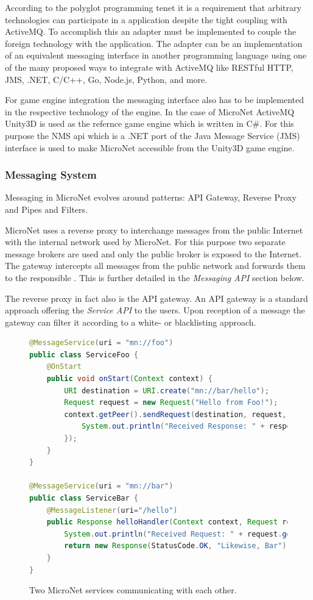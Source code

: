 According to the polyglot programming tenet it is a requirement that arbitrary
technologies can participate in a \ms{} application despite the tight coupling
with ActiveMQ. To accomplish this an adapter must be implemented to couple the
foreign technology with the application. The adapter can be an
implementation of an equivalent messaging interface in another programming
language using one of the many proposed ways to integrate with ActiveMQ like
RESTful HTTP, JMS, .NET, C/C++, Go, Node.js, Python, and more.

For game engine integration the messaging interface also has to be implemented
in the respective technology of the engine. In the case of MicroNet ActiveMQ
Unity3D is used as the refernce game engine which is written in C\#. For this
purpose the NMS \gls{api} which is a .NET port of the Java Message Service (JMS)
interface is used to make MicroNet accessible from the Unity3D game engine.

\subsubsection{Messaging System}

Messaging in MicroNet evolves around patterns: API Gateway, Reverse Proxy and
Pipes and Filters.

MicroNet uses a reverse proxy to interchange messages from the public Internet
with the internal network used by MicroNet. For this purpose two separate
message brokers are used and only the public broker is exposed to the Internet.
The gateway intercepts all messages from the public network and forwards them to
the responsible \ms{}. This is further detailed in the \textit{Messaging API}
section below.

The reverse proxy in fact also is the API gateway. An API gateway is a standard
approach offering the \textit{Service API} to the users. Upon reception of a
message the gateway can filter it according to a white- or blacklisting approach.

\begin{figure}
\begin{lstlisting}[language=Java,firstnumber=1] 
@MessageService(uri = "mn://foo")
public class ServiceFoo {
	@OnStart
	public void onStart(Context context) {
		URI destination = URI.create("mn://bar/hello");
		Request request = new Request("Hello from Foo!");
		context.getPeer().sendRequest(destination, request, response -> {
			System.out.println("Received Response: " + response.getData());
		});
	}
}

@MessageService(uri = "mn://bar")
public class ServiceBar {
	@MessageListener(uri="/hello")
	public Response helloHandler(Context context, Request request) {
		System.out.println("Received Request: " + request.getData());
		return new Response(StatusCode.OK, "Likewise, Bar");
	}
}
\end{lstlisting}
\caption{Two MicroNet services communicating with each other.}
\label{lst:service_communication}
\end{figure}

